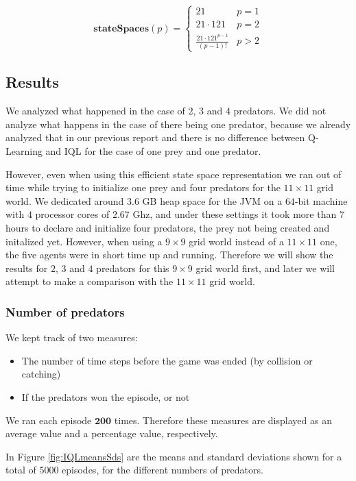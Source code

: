 \[
\mathbf{stateSpaces}(p) = 
\begin{cases}
	21 & p = 1\\
    21 \cdot 121 & p = 2 \\
    \frac{21\cdot 121^{p-1}}{(p-1)!}& p > 2
\end{cases}
\]


\subsection{Results}

We analyzed what happened in the case of 2, 3 and 4 predators.
We did not analyze what happens in the case of there being one predator, because we already analyzed that in our previous report and there is no difference between Q-Learning and IQL for the case of  one prey and one predator.

However, even when using this efficient state space representation we ran out of time while trying to initialize one prey and four predators for the $11 \times 11$ grid world. We dedicated around $3.6$ GB heap space for the JVM on a $64$-bit machine with $4$ processor cores of $2.67$ Ghz, and under these settings it took more than $7$ hours to declare and initialize four predators, the prey not being created and initalized yet.
However, when using a $9 \times 9$ grid world instead of a $11 \times 11$ one, the five agents were in short time up and running. 
Therefore we will show the results for $2$, $3$ and $4$ predators for this $9 \times 9$
 grid world first, and later we will attempt to make a comparison with the $11 \times 11$ grid world.



\subsubsection{Number of predators}\label{sec:IQLresults1}
We kept track of two measures:
\begin{itemize}
\item The number of time steps before the game was ended (by collision or catching)
\item If the predators won the episode, or not 
\end{itemize}
We ran each episode $\mathbf{200}$ times. Therefore these measures are displayed as an average value and a percentage value, respectively.

In Figure \ref{fig:IQLmeansSds} are the means and standard deviations shown for a total of $5000$ episodes, for the different numbers of predators.

